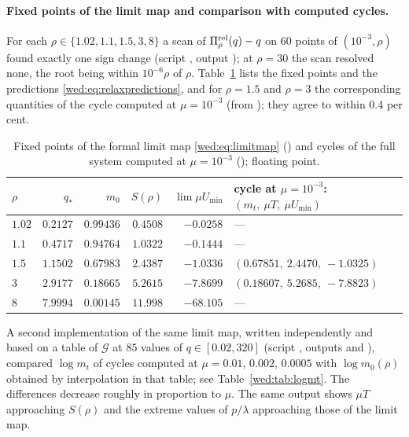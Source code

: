 \paragraph{Fixed points of the limit map and comparison with computed cycles.}
\begin{sloppypar}For each $\rho\in\{1.02,1.1,1.5,3,8\}$ a scan of $\Pi^{\rm rel}_\rho(q)-q$ on $60$ points of $(10^{-3},\rho)$ found exactly one sign change (script , output ); at $\rho=30$ the scan resolved none, the root being within $10^{-6}\rho$ of $\rho$. Table~\ref{wed:tab:limitmap} lists the fixed points and the predictions \eqref{wed:eq:relaxpredictions}, and for $\rho=1.5$ and $\rho=3$ the corresponding quantities of the cycle computed at $\mu=10^{-3}$ (from ); they agree to within $0.4$ per cent.\end{sloppypar}

\begin{table}[ht]
\centering\small
\caption{Fixed points of the formal limit map \eqref{wed:eq:limitmap} (\protect{}) and cycles of the full system computed at $\mu=10^{-3}$ (\protect{}); floating point.}\label{wed:tab:limitmap}
\begin{tabular}{lrrrrl}
\toprule
$\rho$ & $q_*$ & $m_0$ & $S(\rho)$ & $\lim\mu U_{\min}$ & cycle at $\mu=10^{-3}$: $(m_t,\ \mu T,\ \mu U_{\min})$\\
\midrule
$1.02$ & $0.2127$ & $0.99436$ & $0.4508$ & $-0.0258$ & ---\\
$1.1$ & $0.4717$ & $0.94764$ & $1.0322$ & $-0.1444$ & ---\\
$1.5$ & $1.1502$ & $0.67983$ & $2.4387$ & $-1.0336$ & $(0.67851,\ 2.4470,\ -1.0325)$\\
$3$ & $2.9177$ & $0.18665$ & $5.2615$ & $-7.8699$ & $(0.18607,\ 5.2685,\ -7.8823)$\\
$8$ & $7.9994$ & $0.00145$ & $11.998$ & $-68.105$ & ---\\
\bottomrule
\end{tabular}
\end{table}

\begin{sloppypar}A second implementation of the same limit map, written independently and based on a table of $\mathcal G$ at $85$ values of $q\in[0.02,320]$ (script , outputs  and ), compared $\log m_t$ of cycles computed at $\mu=0.01$, $0.002$, $0.0005$ with $\log m_0(\rho)$ obtained by interpolation in that table; see Table~\ref{wed:tab:logmt}. The differences decrease roughly in proportion to $\mu$. The same output shows $\mu T$ approaching $S(\rho)$ and the extreme values of $p/\lambda$ approaching those of the limit map.\end{sloppypar}

